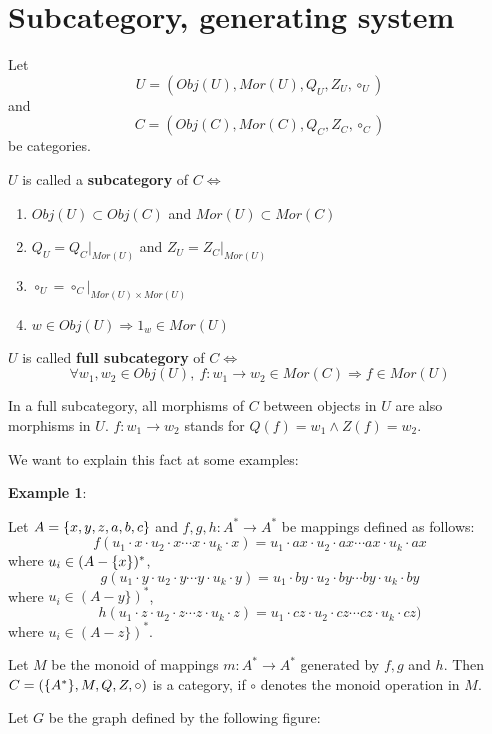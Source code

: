 \section{Subcategory, generating system}

\begin{definition}
Let \[ U = (Obj(U), Mor(U), Q_U, Z_U, \circ_U) \] and \[C = (Obj(C), Mor(C),
Q_C, Z_C, \circ_C)\] be categories.

$U$ is called a {\bf subcategory} of $C \Leftrightarrow$
\begin{enumerate}
  \item $Obj(U) \subset Obj(C)$ and $Mor(U) \subset Mor(C)$
  \item $Q_U = Q_C|_{Mor(U)}$ and $Z_U = Z_C|_{Mor(U)}$
  \item $\circ_U = \circ_C|_{Mor(U) \times Mor(U)}$
  \item $w \in Obj(U) \Rightarrow 1_w \in Mor(U)$
\end{enumerate}
\end{definition}

$U$ is called {\bf full subcategory} of $C \Leftrightarrow$
\[ \forall w_1, w_2 \in Obj(U),\ f: w_1 \to w_2 \in Mor(C) \Rightarrow f \in
Mor(U) \]

In a full subcategory, all morphisms of $C$ between objects in $U$ are also
morphisms in $U$. $f: w_1 \to w_2$ stands for $Q(f) = w_1 \wedge Z(f) = w_2$.

We want to explain this fact at some examples:

{\bf Example 1}:

Let $A = \mbox{$\{x,y,z,a,b,c\}$}$ and $f, g, h: A^* \to A^*$ be mappings defined
as follows:
\[ f(u_1 \cdot x \cdot u_2 \cdot x \cdots x \cdot u_k \cdot x) = 
u_1 \cdot ax \cdot u_2 \cdot ax \cdots ax \cdot u_k \cdot ax \]
where $u_i \in (A - \mbox{$\{x\}$})^*$,
\[ g(u_1 \cdot y \cdot u_2 \cdot y \cdots y \cdot u_k \cdot y) = 
u_1 \cdot by \cdot u_2 \cdot by \cdots by \cdot u_k \cdot by \]
where $u_i \in (A - y\})^*$,
\[ h(u_1 \cdot z \cdot u_2 \cdot z \cdots z \cdot u_k \cdot z) = 
u_1 \cdot cz \cdot u_2 \cdot cz \cdots cz \cdot u_k \cdot cz) \]
where $u_i \in (A - z\})^*$.

Let $M$ be the monoid of mappings $m: A^* \to A^*$ generated by $f, g$ and $h$.
Then $C = (\mbox{$\{A^*\}$}, M, Q, Z, \circ)$ is a category, if $\circ$ denotes the
monoid operation in $M$.

Let $G$ be the graph defined by the following figure:

\begin{center}

\end{center}

